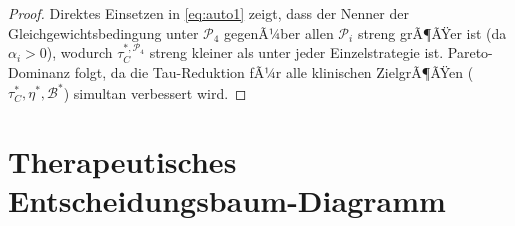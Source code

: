 ﻿\documentclass[12pt,a4paper]{article}
\theoremstyle{definition}
\begin{document}
	\begin{proof}
		Direktes Einsetzen in \eqref{eq:auto1} zeigt, dass der Nenner der Gleichgewichtsbedingung unter $\mathcal{P}_4$ gegenÃ¼ber allen $\mathcal{P}_i$ streng grÃ¶ÃŸer ist (da $\alpha_i > 0$), wodurch $\tau_C^{*,\mathcal{P}_4}$ streng kleiner als unter jeder Einzelstrategie ist. Pareto-Dominanz folgt, da die Tau-Reduktion fÃ¼r alle klinischen ZielgrÃ¶ÃŸen ($\tau_C^*, \eta^*, \mathcal{B}^*$) simultan verbessert wird.
	\end{proof}
	
	\section{Therapeutisches Entscheidungsbaum-Diagramm}
	
\end{document}
